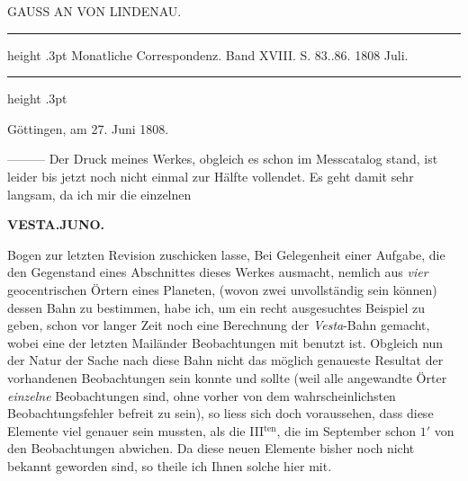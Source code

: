 \par\bigskip
{}
\hypertarget{native-306-lower}{}
\begin{center}
\large GAUSS AN VON LINDENAU.
\end{center}

\begin{center}
\parbox{.72\linewidth}{%
\centering\fontsize{8.2}{10.2}\selectfont
\hrule height .3pt\relax\vspace{2.5pt}
Monatliche Correspondenz. Band XVIII. S. 83..86. 1808 Juli.\par
\vspace{2.5pt}\hrule height .3pt\relax
}
\end{center}

\begin{flushright}
Göttingen, am 27. Juni 1808.
\end{flushright}

\par\indent —\;—\;— Der Druck meines Werkes, obgleich es schon im Messcatalog stand, ist leider bis jetzt
noch nicht einmal zur Hälfte vollendet. Es geht damit sehr langsam, da ich mir die einzelnen
\par
{}
\clearpage
\thispagestyle{empty}
\noindent{}%
%
\parbox[t]{\dimexpr\linewidth-24mm\relax}{\centering\footnotesize\bfseries VESTA.\enspace JUNO.\par}%
\makebox[12mm][r]{}\par\nobreak\medskip
\noindent Bogen zur letzten Revision zuschicken lasse, Bei Gelegenheit einer Aufgabe, die den
Gegenstand eines Abschnittes dieses Werkes ausmacht, nemlich aus \emph{vier}
geocentrischen Örtern eines Planeten, (wovon zwei unvollständig sein können) dessen
Bahn zu bestimmen, habe ich, um ein recht ausgesuchtes Beispiel zu geben, schon vor
langer Zeit noch eine Berechnung der \emph{Vesta}-Bahn gemacht, wobei eine der letzten
Mailänder Beobachtungen mit benutzt ist. Obgleich nun der Natur der Sache nach diese
Bahn nicht das möglich genaueste Resultat der vorhandenen Beobachtungen sein konnte
und sollte (weil alle angewandte Örter \emph{einzelne} Beobachtungen sind, ohne vorher
von dem wahrscheinlichsten Beobachtungsfehler befreit zu sein), so liess sich doch
voraussehen, dass diese Elemente viel genauer sein mussten, als die III$^{\text{ten}}$,
die im September schon $1'$ von den Beobachtungen abwichen. Da diese neuen Elemente
bisher noch nicht bekannt geworden sind, so theile ich Ihnen solche hier mit.



